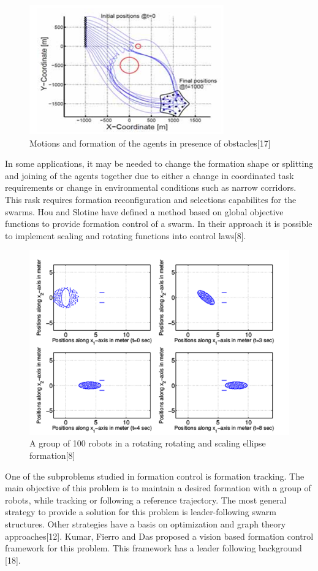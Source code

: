 \documentclass[twoside]{article}
\begin{document}
\begin{figure}[H]
	\caption{Motions and formation of the agents in presence of obstacles[17]}
	\centering
	\includegraphics[scale = 1]{samitha}
\end{figure} 

In some applications, it may be needed to change the formation shape or splitting and joining of the agents together due to either a change in coordinated task requirements or change in environmental conditions such as narrow corridors.  This rask requires formation reconfiguration and selections capabilites for the swarms. Hou and Slotine have defined a method based on global objective functions to provide formation control of a swarm. In their approach it is possible to implement scaling and rotating functions into control laws[8].

\begin{figure}[H]
	\caption{A group of 100 robots in a rotating rotating and scaling ellipse formation[8]}
	\centering
	\includegraphics[scale = 1]{slotine}
\end{figure} 

One of the subproblems studied in formation control is formation tracking. The main objective of this problem is to maintain a desired formation with a group of robots, while tracking or following a reference trajectory. The most general strategy to provide a solution for this problem is leader-following swarm structures. Other strategies have a basis on optimization and graph theory approaches[12]. Kumar, Fierro and Das proposed a vision based formation control framework  for this problem. This framework has a leader following background [18]. 
\end{document}
